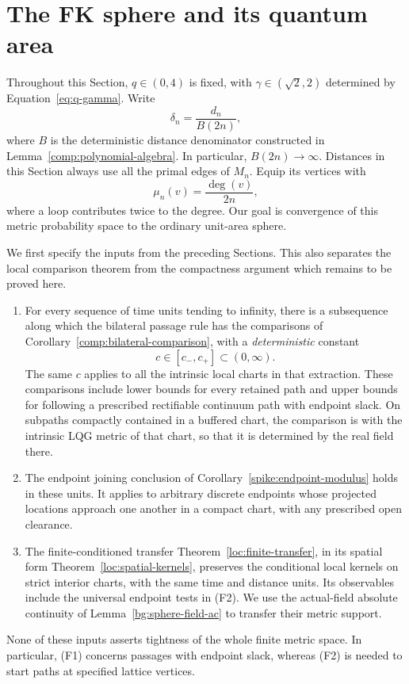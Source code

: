 \section{The FK sphere and its quantum area}
\label{finite:section}

Throughout this Section, \(q\in(0,4)\) is fixed, with
\(\gamma\in(\sqrt2,2)\) determined by Equation~\eqref{eq:q-gamma}. Write
\[
 \delta_n=\frac{d_n}{B(2n)},
\]
where \(B\) is the deterministic distance denominator constructed in
Lemma~\ref{comp:polynomial-algebra}.  In particular,
\(B(2n)\to\infty\).  Distances in this Section always use all the primal
edges of \(M_n\). Equip its vertices with
\[
                      \mu_n(v)=\frac{\deg(v)}{2n},
\]
where a loop contributes twice to the degree. Our goal is convergence
of this metric probability space to the ordinary unit-area sphere.

We first specify the inputs from the preceding Sections.  This also
separates the local comparison theorem from the compactness argument
which remains to be proved here.
\begin{enumerate}[label=(F\arabic*)]
\item
For every sequence of time units tending to infinity, there is a
subsequence along which the bilateral passage rule has the comparisons
of Corollary~\ref{comp:bilateral-comparison}, with a
\emph{deterministic} constant
\[
                 c\in[c_-,c_+]\subset(0,\infty).
\]
The same \(c\) applies to all the intrinsic local charts in that
extraction.  These comparisons include lower bounds for every retained
path and upper bounds for following a prescribed rectifiable continuum
path with endpoint slack.  On subpaths compactly contained in a
buffered chart, the comparison is with the intrinsic LQG metric of that
chart, so that it is determined by the real field there.
\item
The endpoint joining conclusion of
Corollary~\ref{spike:endpoint-modulus} holds in these units.  It applies to
arbitrary discrete endpoints whose projected locations approach one
another in a compact chart, with any prescribed open clearance.
\item
The finite-conditioned transfer
Theorem~\ref{loc:finite-transfer}, in its spatial form
Theorem~\ref{loc:spatial-kernels}, preserves the conditional local
kernels on strict interior charts, with the same time and distance
units.  Its observables include the universal endpoint tests in (F2).
We use the actual-field absolute continuity of
Lemma~\ref{bg:sphere-field-ac} to transfer their metric support.
\end{enumerate}
None of these inputs asserts tightness of the whole finite metric
space.  In particular, (F1) concerns passages with endpoint slack,
whereas (F2) is needed to start paths at specified lattice vertices.

